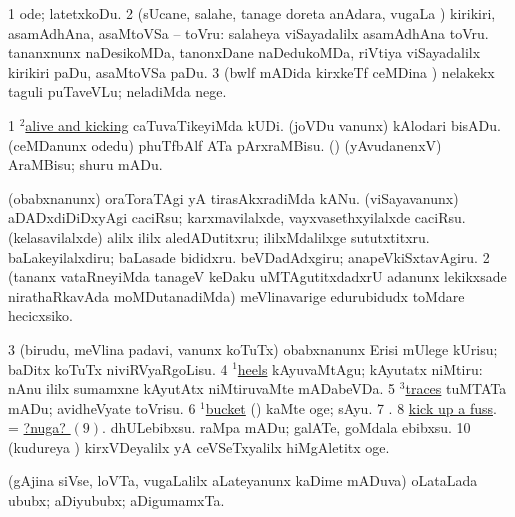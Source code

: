 \noindent
\gl{\akirx}
\bmng
\bnum
\num{1} ode; latetxkoDu. 
\num{2} (sUcane, salahe, tanage doreta anAdara, \mo vugaLa \vi) kirikiri, asamAdhAna, asaMtoVSa -- toVru:  salaheya viSayadalilx asamAdhAna toVru.  tananxnunx naDesikoMDa, tanonxDane naDedukoMDa, riVtiya viSayadalilx kirikiri paDu, asaMtoVSa paDu. 
\num{3} (bwlf mADida kirxkeTf ceMDina \vi) nelakekx taguli puTaveVLu; neladiMda nege. 
\enum
\emng

\noindent
\gl{\pagu}
\bmng
\bnum
\num{1} \hyperref{kandict_a.pdf}{A}{alive(2) pagu(1)}{$^2$alive and kicking} caTuvaTikeyiMda kUDi. 
  
\banum
{} (joVDu \mo vanunx) kAlodari bisADu. 
 (ceMDanunx odedu) phuTfbAlf ATa pArxraMBisu. 
 (\AmA) (yAvudanenxV) AraMBisu; shuru mADu. 
\eanum
\numie
\enum
\emng

\noindent
\gl{\nuga}
\bmng
\bnum
{}   
\banum
{} (obabxnanunx) oraToraTAgi yA tirasAkxradiMda kANu. 
 (viSayavanunx) aDADxdiDiDxyAgi caciRsu; karxmavilalxde, vayxvasethxyilalxde caciRsu. 
 (kelasavilalxde) alilx ililx aledADutitxru; ililxMdalilxge sututxtitxru. 
 baLakeyilalxdiru; baLasade bididxru. 
 beVDadAdxgiru; anapeVkiSxtavAgiru. 
\eanum
\numie
\num{2}  (tananx vataRneyiMda tanageV keDaku uMTAgutitxdadxrU adanunx lekikxsade nirathaRkavAda moMDutanadiMda) meVlinavarige edurubidudx toMdare hecicxsiko. 
\num{3}  (birudu, meVlina padavi, \mo vanunx koTuTx) obabxnanunx Erisi mUlege kUrisu; baDitx koTuTx niviRVyaRgoLisu. 
\num{4}  \hyperref{kandict_h.pdf}{H}{heel(1) nuga(9)}{$^1$heels} kAyuvaMtAgu; kAyutatx niMtiru:  nAnu ililx sumamxne kAyutAtx niMtiruvaMte mADabeVDa. 
\num{5}  \hyperref{kandict_t.pdf}{T}{trace(3) pagu}{$^3$traces} tuMTATa mADu; avidheVyate toVrisu. 
\num{6}  \hyperref{kandict_b.pdf}{B}{bucket(1) nuga(2)}{$^1$bucket} (\ashi) kaMte oge; sAyu. 
\num{7} . 
\num{8} \hyperlink{kicknuga9}{kick up a fuss}. = \hyperlink{kicknuga9}{?nuga? \((9)\)}. 
\hypertarget{kicknuga9}{} 
  
\banum
{} dhULebibxsu. 
 raMpa mADu; galATe, goMdala ebibxsu. 
\eanum
\numie
\num{10}  (kudureya \vi) kirxVDeyalilx yA ceVSeTxyalilx hiMgAletitx oge. 
\enum
\emng
\eentry

\bentry
{}
\gl{\nA}
\bmng
(gAjina siVse, loVTa, \mo vugaLalilx aLateyanunx kaDime mADuva) oLataLada ububx; aDiyububx; aDigumamxTa. 
\emng
\eentry

